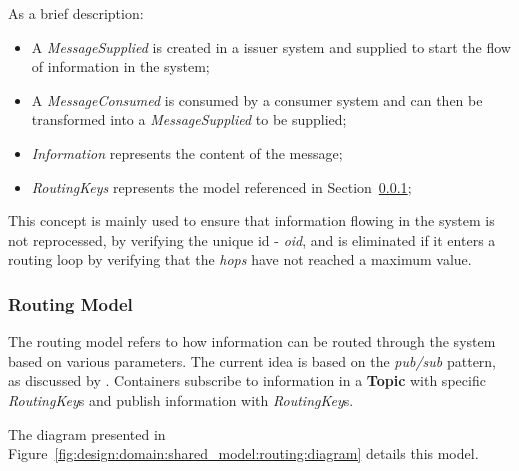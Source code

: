 As a brief description:

\begin{itemize}
   \item A \textit{MessageSupplied} is created in a issuer system and supplied to start the flow of information in the system;
   \item A \textit{MessageConsumed} is consumed by a consumer system and can then be transformed into a \textit{MessageSupplied} to be supplied;
   \item \textit{Information} represents the content of the message;
   \item \textit{RoutingKeys} represents the model referenced in Section~\ref{subsubsec:design:domain:shared_model:routing};
\end{itemize}

This concept is mainly used to ensure that information flowing in the system is not reprocessed, by verifying the unique id - \textit{oid}, and is eliminated if it enters a routing loop by verifying that the \textit{hops} have not reached a maximum value.

\subsubsection{Routing Model}
\label{subsubsec:design:domain:shared_model:routing}

The routing model refers to how information can be routed through the system based on various parameters. The current idea is based on the \textit{pub/sub} pattern, as discussed by \cite{urquhart2021flow}. Containers subscribe to information in a \textbf{Topic} with specific \textit{RoutingKey}s and publish information with \textit{RoutingKey}s.

The diagram presented in Figure~\ref{fig:design:domain:shared_model:routing:diagram} details this model.

